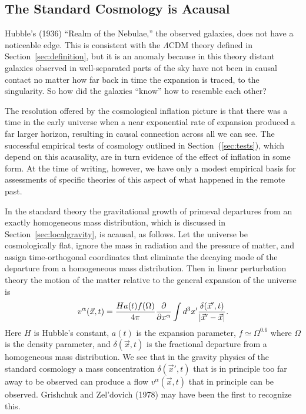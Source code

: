 \documentclass[fleqn,usenatbib]{mnras}
\newcommand{\beq}{\begin{equation}}
\newcommand{\eeq}{\end{equation}}
\begin{document}
\subsection{The  Standard Cosmology is Acausal}\label{sec:theacausaluiverse}

Hubble's (1936) ``Realm of the Nebulae,'' the observed galaxies, does not have a noticeable edge. This is consistent with the $\Lambda$CDM theory defined in Section~\ref{sec:definition}, but it is an anomaly because in this theory distant galaxies observed in well-separated parts of the sky have not been in causal contact no matter how far back in time the expansion is traced, to the singularity. So how did the galaxies ``know'' how to resemble each other? 

The resolution offered by the cosmological inflation picture is that there was a time in the early universe when a near exponential rate of expansion produced a far larger horizon, resulting in causal connection across all we can see. The successful empirical tests of cosmology outlined in Section~(\ref{sec:tests}), which depend on this acausality, are in turn evidence of the effect of inflation in some form. At the time of writing, however, we have only a modest empirical basis for assessments of specific theories of this aspect of what happened in the remote past. 

In the standard theory the gravitational growth of primeval departures from an exactly homogeneous mass distribution, which is discussed in Section~\ref{sec:localgravity}, is acausal, as follows. Let the universe be cosmologically flat, ignore the mass in radiation and the pressure of matter, and assign time-orthogonal coordinates that eliminate the decaying mode of the departure from a homogeneous mass distribution. Then in linear perturbation theory the motion of the matter relative to the general expansion of the universe is
\beq
v^\alpha(\vec x,t) = {Ha(t)f(\Omega)\over 4\pi}
{\partial\over\partial x^\alpha} \int d^3x'{\delta(\vec x',t)\over |\vec x' - \vec x|}. 
\label{eq:peculiaracceleration}
\eeq
Here $H$ is Hubble's constant, $a(t)$ is the expansion parameter, $f\simeq \Omega^{0.6}$ where $\Omega$ is the density parameter, and $\delta(\vec x,t)$ is the fractional departure from a homogeneous mass distribution. We see that in the gravity physics of the standard cosmology a mass concentration $\delta(\vec x',t)$ that is in principle too far away to be observed can produce a flow $v^\alpha(\vec x,t)$ that in principle can be observed. Grishchuk and Zel'dovich (1978) may have been the first to recognize this. 
\end{document}
